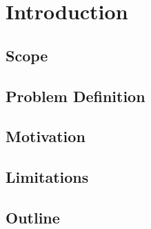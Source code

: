\chapter{Introduction}
\section{Scope}

\section{Problem Definition}

\section{Motivation}

\section{Limitations}

\section{Outline}